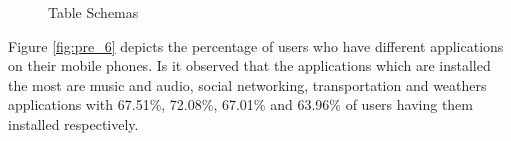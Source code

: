 \begin{figure}[htp]
\hspace{1em}
\newline
\centering
{}

\caption{Table Schemas}
\label{fig:s3}
\end{figure}

Figure \ref{fig:pre_6} depicts the percentage of users who have different applications on their mobile phones. Is it observed that the applications which are installed the most are music and audio, social networking, transportation and weathers applications with 67.51\%, 72.08\%, 67.01\% and 63.96\% of users having them installed respectively.


